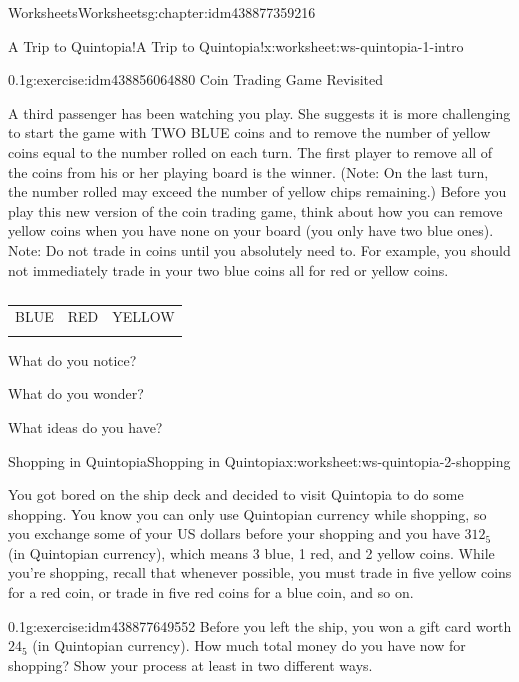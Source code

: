 \documentclass[twoside,11pt,]{book}
\begin{document}
\begin{chapterptx}{Worksheets}{}{Worksheets}{}{}{g:chapter:idm438877359216}
\begin{worksheet-section-numberless}{A Trip to Quintopia!}{}{A Trip to Quintopia!}{}{}{x:worksheet:ws-quintopia-1-intro}
\begin{divisionexercise}{2}{}{0.1}{g:exercise:idm438856064880}
Coin Trading Game Revisited%
\par
A third passenger has been watching you play.  She suggests it is more challenging to start the game with TWO BLUE coins and to remove the number of yellow coins equal to the number rolled on each turn.  The first player to remove all of the coins from his or her playing board is the winner.  (Note: On the last turn, the number rolled may exceed the number of yellow chips remaining.)  Before you play this new version of the coin trading game, think about how you can remove yellow coins when you have none on your board (you only have two blue ones).  Note: Do not trade in coins until you absolutely need to.  For example, you should not immediately trade in your two blue coins all for red or yellow coins.%
\begin{table}
\centering
\begin{tabular}{lll}
BLUE&RED&YELLOW\tabularnewline[0pt]
&&
\end{tabular}
\caption{\label{g:table:idm438832977664}}
\end{table}
What do you notice?%
\par
What do you wonder?%
\par
What ideas do you have?%
\end{divisionexercise}%
\end{worksheet-section-numberless}
\restoregeometry
%
%
\typeout{************************************************}
\typeout{************************************************}
%
\begin{worksheet-section-numberless}{Shopping in Quintopia}{}{Shopping in Quintopia}{}{}{x:worksheet:ws-quintopia-2-shopping}
\begin{introduction}{}%
You got bored on the ship deck and decided to visit Quintopia to do some shopping. You know you can only use Quintopian currency while shopping, so you exchange some of your US dollars before your shopping and you have \(312_{5}\) (in Quintopian currency), which means 3 blue, 1 red, and 2 yellow coins. While you’re shopping, recall that whenever possible, you must trade in five yellow coins for a red coin, or trade in five red coins for a blue coin, and so on.%
\end{introduction}%
\begin{divisionexercise}{1}{}{0.1}{g:exercise:idm438877649552}%
Before you left the ship, you won a gift card worth \(24_{5}\) (in Quintopian currency). How much total money do you have now for shopping? Show your process at least in two different ways.%

\end{divisionexercise}
\end{worksheet-section-numberless}
\end{chapterptx}
\end{document}
